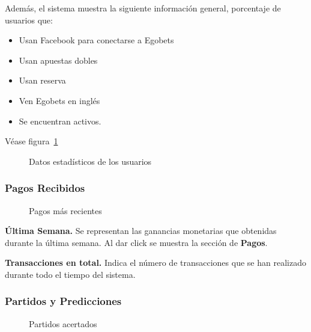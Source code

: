 Además, el sistema muestra la siguiente información general, porcentaje de usuarios que:
\begin{itemize}
	\item Usan Facebook para conectarse a Egobets
	\item Usan apuestas dobles
	\item Usan reserva
	\item Ven Egobets en inglés
	\item Se encuentran activos.
\end{itemize}
Véase figura~\ref{Fig:graficas-usuarios}
\begin{figure}[!htb]\centering
   \begin {minipage}{1\textwidth}
     \caption{Datos estadísticos de los usuarios}
	 \label{Fig:graficas-usuarios}
   \end{minipage}
\end{figure}
 
\subsubsection{Pagos Recibidos}

\begin{figure}[!htb]\centering
   \begin {minipage}{0.5\textwidth}
     \caption{Pagos más recientes}
	 \label{Fig:ultimos-pagos}
   \end{minipage}
\end{figure}

\textbf{Última Semana.}
Se representan las ganancias monetarias que obtenidas durante la última semana. Al dar click se muestra la sección de \textbf{Pagos}.

\textbf{Transacciones en total.}
Indica el número de transacciones que se han realizado durante todo el tiempo del sistema.

\subsubsection{Partidos y Predicciones}

\begin{figure}[!htb]\centering
   \begin {minipage}{0.5\textwidth}
     \caption{Partidos acertados}
	 \label{Fig:partidos-acertados}
   \end{minipage}
\end{figure}

